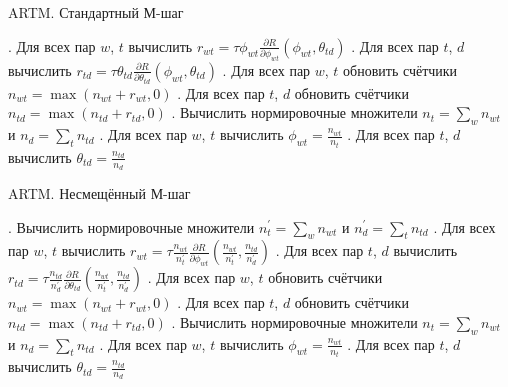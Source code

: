 \documentclass[12pt]{article}
\begin{document}
\begin{algorithm}
\caption{ARTM. Стандартный М-шаг}\label{malgo1}
\begin{algorithmic}[]
. Для всех пар $w$, $t$ вычислить $r_{wt} = \tau \phi_{wt} \frac{\partial{R}}{\partial{\phi_{wt}}}(\phi_{wt}, \theta_{td})$
. Для всех пар $t$, $d$ вычислить $r_{td} =\tau  \theta_{td} \frac{\partial{R}}{\partial{\theta_{td}}}(\phi_{wt}, \theta_{td})$
. Для всех пар $w$, $t$ обновить счётчики $n_{wt} = \max(n_{wt} + r_{wt}, 0)$
. Для всех пар $t$, $d$ обновить счётчики $n_{td} = \max(n_{td} + r_{td}, 0)$
. Вычислить нормировочные множители $n_t = \sum_w n_{wt}$ и $n_d = \sum_t n_{td}$
. Для всех пар $w$, $t$ вычислить $\phi_{wt} = \frac{n_{wt}}{n_t}$
. Для всех пар $t$, $d$ вычислить $\theta_{td} = \frac{n_{td}}{n_d}$
\EndProcedure
\end{algorithmic}
\end{algorithm}
\begin{algorithm}
\caption{ARTM. Несмещённый М-шаг}\label{malgo2}
\begin{algorithmic}[]
. Вычислить нормировочные множители $n^{\prime}_t = \sum_w n_{wt}$ и $n^{\prime}_d = \sum_t n_{td}$
. Для всех пар $w$, $t$ вычислить $r_{wt}= \tau \frac{n_{wt}}{n^{\prime}_t}\frac{\partial{R}}{\partial{\phi_{wt}}}(\frac{n_{wt}}{n^{\prime}_t}, \frac{n_{td}}{n^{\prime}_d})$
. Для всех пар $t$, $d$ вычислить $r_{td}= \tau \frac{n_{td}}{n^{\prime}_d}\frac{\partial{R}}{\partial{\theta_{td}}}(\frac{n_{wt}}{n^{\prime}_t}, \frac{n_{td}}{n^{\prime}_d})$
. Для всех пар $w$, $t$ обновить счётчики $n_{wt} = \max(n_{wt} + r_{wt}, 0)$
. Для всех пар $t$, $d$ обновить счётчики $n_{td} = \max(n_{td} + r_{td}, 0)$
. Вычислить нормировочные множители $n_t = \sum_w n_{wt}$ и $n_d = \sum_t n_{td}$
. Для всех пар $w$, $t$ вычислить $\phi_{wt} = \frac{n_{wt}}{n_t}$
. Для всех пар $t$, $d$ вычислить $\theta_{td} = \frac{n_{td}}{n_d}$
\EndProcedure
\end{algorithmic}
\end{algorithm}
\end{document}
